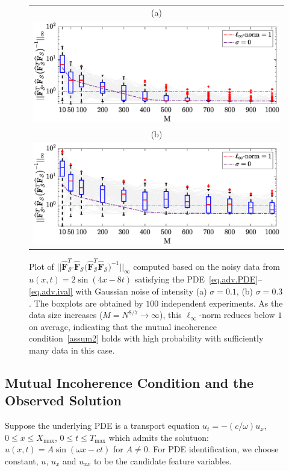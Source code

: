 \documentclass[a4paper,11pt]{article}
\begin{document}
\begin{figure}
\centering
\begin{tabular}{c}
(a)\\
\includegraphics[scale=0.5]{Figures/transportMIP_0_1.eps}\\
(b)\\
\includegraphics[scale=0.5]{Figures/transportMIP_0_3.eps}
\end{tabular}
\caption{Plot of $||\widehat{\mathbf{F}}_{\mathcal{S}^c}^T\widehat{\mathbf{F}}_{\mathcal{S}}\big(\widehat{\mathbf{F}}_{\mathcal{S}}^T\widehat{\mathbf{F}}_{\mathcal{S}}\big)^{-1}||_\infty$  computed based on the noisy data from $u(x,t)=2\sin(4x-8t)$ satisfying the PDE~\eqref{eq.adv.PDE}--\eqref{eq.adv.ival} with Gaussian noise of intensity (a) $\sigma=0.1$, (b) $\sigma=0.3$. The boxplots are obtained by $100$ independent experiments. As the data size increases ($M=N^{8/7}\to\infty$), this $\ell_\infty$-norm reduces below $1$ on average, indicating that the mutual incoherence condition~\eqref{assum2} holds with high probability with sufficiently many data in this case. }\label{fig.MIPtransport}
\end{figure}



\subsection{Mutual Incoherence Condition and the Observed Solution}
Suppose the underlying PDE is a transport equation $u_t=-(c/\omega)u_x$, $0\leq x\leq X_{\max}$, $0\leq t\leq T_{\max}$ which admits the solutuon: $u(x,t)=A\sin(\omega x-ct)$ for $A\neq 0$. For PDE identification, we choose constant, $u$, $u_x$ and $u_{xx}$ to be the candidate feature variables.
\end{document}
